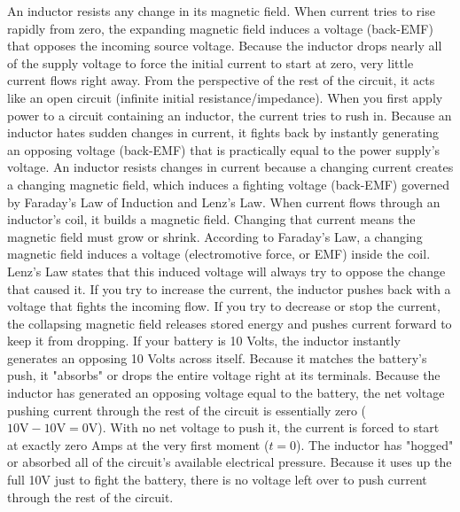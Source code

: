 \documentclass{report}
\begin{document}
\begin{itemize}
            \bigbreak \noindent 
            An inductor resists any change in its magnetic field. When current tries to rise rapidly from zero, the expanding magnetic field induces a voltage (back-EMF) that opposes the incoming source voltage.
            \bigbreak \noindent 
            Because the inductor drops nearly all of the supply voltage to force the initial current to start at zero, very little current flows right away. From the perspective of the rest of the circuit, it acts like an open circuit (infinite initial resistance/impedance).
            \bigbreak \noindent 
            When you first apply power to a circuit containing an inductor, the current tries to rush in. Because an inductor hates sudden changes in current, it fights back by instantly generating an opposing voltage (back-EMF) that is practically equal to the power supply's voltage.
            \bigbreak \noindent 
            An inductor resists changes in current because a changing current creates a changing magnetic field, which induces a fighting voltage (back-EMF) governed by Faraday's Law of Induction and Lenz's Law.  When current flows through an inductor’s coil, it builds a magnetic field. Changing that current means the magnetic field must grow or shrink. According to Faraday's Law, a changing magnetic field induces a voltage (electromotive force, or EMF) inside the coil. Lenz's Law states that this induced voltage will always try to oppose the change that caused it. If you try to increase the current, the inductor pushes back with a voltage that fights the incoming flow. If you try to decrease or stop the current, the collapsing magnetic field releases stored energy and pushes current forward to keep it from dropping.
            \bigbreak \noindent 
            If your battery is 10 Volts, the inductor instantly generates an opposing 10 Volts across itself. Because it matches the battery's push, it "absorbs" or drops the entire voltage right at its terminals. Because the inductor has generated an opposing voltage equal to the battery, the net voltage pushing current through the rest of the circuit is essentially zero (\(10\text{V} - 10\text{V} = 0\text{V}\)). With no net voltage to push it, the current is forced to start at exactly zero Amps at the very first moment (\(t = 0\)).
            \bigbreak \noindent 
            The inductor has "hogged" or absorbed all of the circuit's available electrical pressure. Because it uses up the full 10V just to fight the battery, there is no voltage left over to push current through the rest of the circuit.
            \bigbreak \noindent 

\end{itemize}
\end{document}

